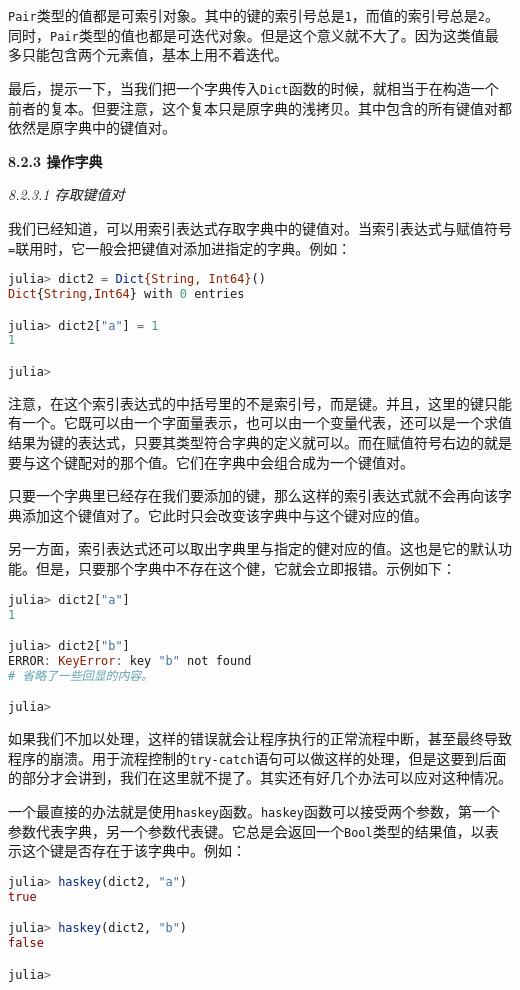 \verb`Pair`类型的值都是可索引对象。其中的键的索引号总是\verb`1`，而值的索引号总是\verb`2`。同时，\verb`Pair`类型的值也都是可迭代对象。但是这个意义就不大了。因为这类值最多只能包含两个元素值，基本上用不着迭代。

最后，提示一下，当我们把一个字典传入\verb`Dict`函数的时候，就相当于在构造一个前者的复本。但要注意，这个复本只是原字典的浅拷贝。其中包含的所有键值对都依然是原字典中的键值对。

\textbf{8.2.3 操作字典}

\textsl{8.2.3.1 存取键值对}

我们已经知道，可以用索引表达式存取字典中的键值对。当索引表达式与赋值符号\verb`=`联用时，它一般会把键值对添加进指定的字典。例如：
\begin{lstlisting}[language=julia]
julia> dict2 = Dict{String, Int64}()
Dict{String,Int64} with 0 entries

julia> dict2["a"] = 1
1

julia> 
\end{lstlisting}

注意，在这个索引表达式的中括号里的不是索引号，而是键。并且，这里的键只能有一个。它既可以由一个字面量表示，也可以由一个变量代表，还可以是一个求值结果为键的表达式，只要其类型符合字典的定义就可以。而在赋值符号右边的就是要与这个键配对的那个值。它们在字典中会组合成为一个键值对。

只要一个字典里已经存在我们要添加的键，那么这样的索引表达式就不会再向该字典添加这个键值对了。它此时只会改变该字典中与这个键对应的值。

另一方面，索引表达式还可以取出字典里与指定的健对应的值。这也是它的默认功能。但是，只要那个字典中不存在这个健，它就会立即报错。示例如下：
\begin{lstlisting}[language=julia]
julia> dict2["a"]
1

julia> dict2["b"]
ERROR: KeyError: key "b" not found
# 省略了一些回显的内容。

julia> 
\end{lstlisting}

如果我们不加以处理，这样的错误就会让程序执行的正常流程中断，甚至最终导致程序的崩溃。用于流程控制的\verb`try-catch`语句可以做这样的处理，但是这要到后面的部分才会讲到，我们在这里就不提了。其实还有好几个办法可以应对这种情况。

一个最直接的办法就是使用\verb`haskey`函数。\verb`haskey`函数可以接受两个参数，第一个参数代表字典，另一个参数代表键。它总是会返回一个\verb`Bool`类型的结果值，以表示这个键是否存在于该字典中。例如：
\begin{lstlisting}[language=julia]
julia> haskey(dict2, "a")
true

julia> haskey(dict2, "b")
false

julia>
\end{lstlisting}

